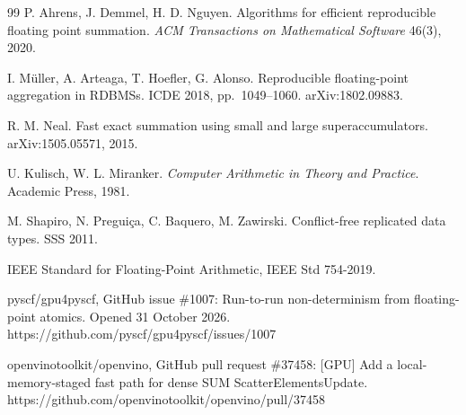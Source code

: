 \documentclass[journal]{IEEEtran}
\begin{document}
\begin{thebibliography}{99}
 P. Ahrens, J. Demmel, H. D. Nguyen. Algorithms for efficient
reproducible floating point summation. \emph{ACM Transactions on
Mathematical Software} 46(3), 2020.

 I. Müller, A. Arteaga, T. Hoefler, G. Alonso. Reproducible
floating-point aggregation in RDBMSs. ICDE 2018, pp.~1049--1060. arXiv:1802.09883.

 R. M. Neal. Fast exact summation using small and large
superaccumulators. arXiv:1505.05571, 2015.

 U. Kulisch, W. L. Miranker. \emph{Computer Arithmetic in Theory and
Practice}. Academic Press, 1981.

 M. Shapiro, N. Preguiça, C. Baquero, M. Zawirski. Conflict-free
replicated data types. SSS 2011.

 IEEE Standard for Floating-Point Arithmetic, IEEE Std 754-2019.

 pyscf/gpu4pyscf, GitHub issue \#1007: Run-to-run non-determinism from
floating-point atomics. Opened 31 October 2026.
https://github.com/pyscf/gpu4pyscf/issues/1007

 openvinotoolkit/openvino, GitHub pull request \#37458: {[}GPU{]} Add a
local-memory-staged fast path for dense SUM ScatterElementsUpdate.
https://github.com/openvinotoolkit/openvino/pull/37458
\end{thebibliography}
\end{document}
